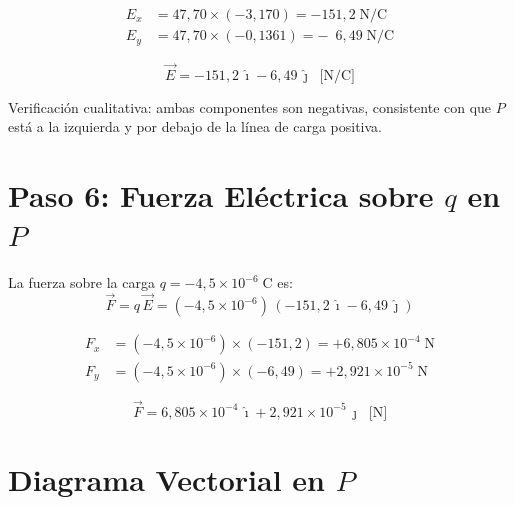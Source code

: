 \documentclass[12pt,letterpaper]{article}
\begin{document}
\begin{align*}
    E_x &= 47{,}70 \times (-3{,}170) = -151{,}2\;\text{N/C}\\
    E_y &= 47{,}70 \times (-0{,}1361) = -\phantom{0}6{,}49\;\text{N/C}
\end{align*}

\begin{equation*}
    \boxed{\vec{E} = -151{,}2\,\hat{\imath} - 6{,}49\,\hat{\jmath}\;\;\text{[N/C]}}
\end{equation*}

Verificaci\'on cualitativa: ambas componentes son negativas, consistente con que $P$ est\'a a la izquierda y por debajo de la l\'inea de carga positiva.

\section*{Paso 6: Fuerza El\'ectrica sobre $q$ en $P$}

La fuerza sobre la carga $q = -4{,}5\times10^{-6}\;\text{C}$ es:
\begin{equation*}
    \vec{F} = q\,\vec{E}
    = (-4{,}5\times10^{-6})\,(-151{,}2\,\hat{\imath} - 6{,}49\,\hat{\jmath})
\end{equation*}

\begin{align*}
    F_x &= (-4{,}5\times10^{-6})\times(-151{,}2) = +6{,}805\times10^{-4}\;\text{N}\\
    F_y &= (-4{,}5\times10^{-6})\times(-6{,}49) = +2{,}921\times10^{-5}\;\text{N}
\end{align*}

\begin{equation*}
    \boxed{\vec{F} = 6{,}805\times10^{-4}\,\hat{\imath} + 2{,}921\times10^{-5}\,\hat{\jmath}\;\;\text{[N]}}
\end{equation*}

\section*{Diagrama Vectorial en $P$}
\end{document}
